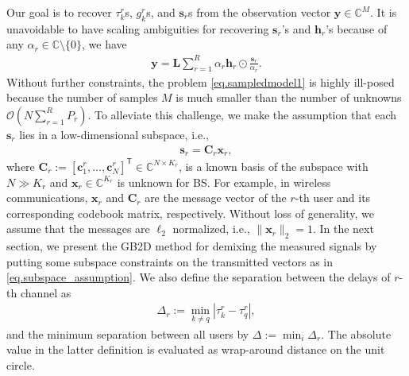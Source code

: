 \documentclass[conference,10pt]{IEEEtran}
\theoremstyle{remark}
\theoremstyle{plain}
\theoremstyle{definition}
\theoremstyle{remark}
\begin{document}
 Our goal is to recover $\tau_k^r$s, $g_k^r$s, and $\bm{s}_r$s from the observation vector $\bm{y}\in\mathbb{C}^{M}$. It is unavoidable to have scaling ambiguities for recovering $\bm{s}_r$'s and $\bm{h}_r$'s because of any $\alpha_r\in\mathbb{C}\setminus\{0\}$, we have
 \begin{align}
 \bm{y}= \bm{L}\sum_{r=1}^R\alpha_r\bm{h}_r\odot \frac{\bm{s}_r}{\alpha_r}.
 \end{align}
 Without further constraints, the problem \eqref{eq.sampledmodel1} is highly ill-posed because the number of samples $M$ is much smaller than the  number of unknowns $\mathcal{O}(N\sum_{r=1}^R P_r)$. To alleviate this challenge, we make the assumption that each $\bm{s}_r$ lies in a low-dimensional subspace, i.e.,
 \begin{align}\label{eq.subspace_assumption}
 \bm{s}_r=\bm{C}_r\bm{x}_r,
 \end{align} 
 where $\bm{C}_r:=[\bm{c}_{1}^r, \ldots, \bm{c}_{N}^r]^{\mathsf{T}}\in\mathbb{C}^{N\times K_r}$,
  is a known basis of the subspace with $N\gg K_r$ and $\bm{x}_r\in\mathbb{C}^{K_r}$ is unknown for BS. For example, in wireless communications, $\bm{x}_r$  and $\bm{C}_r$ are the message vector of the $r$-th user and its corresponding codebook matrix, respectively.  Without loss of generality, we assume that the messages are $\ell_2$ normalized, i.e., $\|\bm{x}_r\|_2=1$. In the next section, we present the GB2D method for demixing the measured signals by putting some subspace constraints on the transmitted vectors as in \eqref{eq.subspace_assumption}. 
  We also define the separation between the delays of $r$-th channel as
\begin{align}
\Delta_r:=\min_{k\neq q}|\tau^r_k-\tau^r_q|,
\end{align} 
and the minimum separation between all users by $\Delta:=\min_{i} \Delta_r$. The absolute value in the latter definition is evaluated as wrap-around distance on the unit circle.

 

\end{document}
